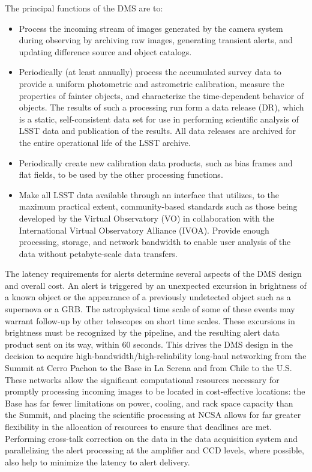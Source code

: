 \documentclass[DM,toc]{lsstdoc}
\begin{document}
The principal functions of the DMS are to:
\begin{itemize}
	\item Process the incoming stream of images generated by the camera system during observing by archiving raw images, generating transient alerts, and updating difference source and object catalogs.
	\item Periodically (at least annually) process the accumulated survey data to provide a uniform photometric and astrometric calibration, measure the properties of fainter objects, and characterize the time-dependent behavior of objects. The results of such a processing run form a data release (DR), which is a static, self-consistent data set for use in performing scientific analysis of LSST data and publication of the results. All data releases are archived for the entire operational life of the LSST archive.
	\item Periodically create new calibration data products, such as bias frames and flat fields, to be used by the other processing functions.
	\item Make all LSST data available through an interface that utilizes, to the maximum practical extent, community-based standards such as those being developed by the Virtual Observatory (VO) in collaboration with the International Virtual Observatory Alliance (IVOA).  Provide enough processing, storage, and network bandwidth to enable user analysis of the data without petabyte-scale data transfers.
\end{itemize}

The latency requirements for alerts determine several aspects of the DMS design
and overall cost.  An alert is triggered by an unexpected excursion in
brightness of a known object or the appearance of a previously undetected
object such as a supernova or a GRB. The astrophysical time scale of some of
these events may warrant follow-up by other telescopes on short time scales.
These excursions in brightness must be recognized by the pipeline, and the
resulting alert data product sent on its way, within 60 seconds. This drives
the DMS design in the decision to acquire high-bandwidth/high-reliability
long-haul networking from the Summit at Cerro Pachon to the Base in La Serena and from Chile to the U.S. These networks allow the significant computational
resources necessary for promptly processing incoming images to be located in
cost-effective locations: the Base has far fewer limitations on power, cooling,
and rack space capacity than the Summit, and placing the scientific
processing at NCSA allows for far greater flexibility in the allocation of
resources to ensure that deadlines are met. Performing cross-talk correction
on the data in the data acquisition system and parallelizing the alert
processing at the amplifier and CCD levels, where possible, also help to
minimize the latency to alert delivery.
\end{document}
